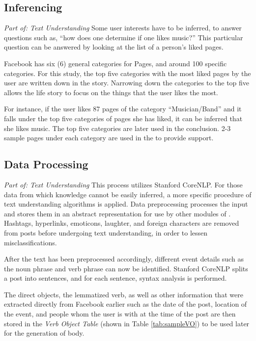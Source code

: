 \subsection{Inferencing}
\textit{Part of: Text Understanding} \newline \newline
Some user interests have to be inferred, to answer questions such as, ``how does one determine if one likes music?” This particular question can be answered by looking at the list of a person's liked pages.

Facebook has six (6) general categories for Pages, and around 100 specific categories. For this study, the top five categories with the most liked pages by the user are written down in the story. Narrowing down the categories to the top five allows the life story to focus on the things that the user likes the most.

For instance, if the user likes 87 pages of the category ``Musician/Band” and it falls under the top five categories of pages she has liked, it can be inferred that she likes music. The top five categories are later used in the conclusion. 2-3 sample pages under each category are used in the to provide support.

\subsection{Data Processing}
\textit{Part of: Text Understanding} \newline \newline
This process utilizes Stanford CoreNLP. For those data from which knowledge cannot be easily inferred, a more specific procedure of text understanding algorithms is applied. Data preprocessing processes the input and stores them in an abstract representation for use by other modules of \systemname. Hashtags, hyperlinks, emoticons, laughter, and foreign characters are removed from posts before undergoing text understanding, in order to lessen misclassifications.

After the text has been preprocessed accordingly, different event details such as the noun phrase and verb phrase can now be identified. Stanford CoreNLP splits a post into sentences, and for each sentence, syntax analysis is performed.

The direct objects, the lemmatized verb, as well as other information that were extracted directly from Facebook earlier such as the date of the post, location of the event, and people whom the user is with at the time of the post are then stored in the \textit{Verb Object Table} (shown in Table \ref{tab:sampleVO}) to be used later for the generation of body.

